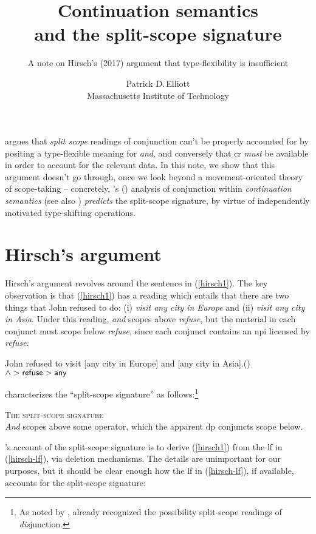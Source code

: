 \documentclass[cronos]{ling-paper}
\title{Continuation semantics\\
  and the split-scope signature}
\subtitle{A note on Hirsch's (2017) argument that type-flexibility is insufficient}
\author{Patrick D.\,Elliott\\Massachusetts Institute of Technology}
\begin{document}
\maketitle

\citet{hirschThesis} argues that \textit{split scope} readings of conjunction
can't be properly accounted for by positing a type-flexible meaning for
\textit{and}, and conversely that \ac{cr} \textit{must} be available in order to
account for the relevant data. In this note, we show that this argument doesn't
go through, once we look beyond a movement-oriented theory of scope-taking -- concretely, \citeauthor{barker2002}'s (\citeyear{barker2002}) analysis of conjunction
within \textit{continuation semantics} (see also \citealt[chapter
7]{barkerShan2015}) \textit{predicts} the split-scope signature, by virtue of
independently motivated type-shifting operations.

\section{Hirsch's argument}

Hirsch's argument revolves around the sentence in (\ref{hirsch1}). The key
observation is that (\ref{hirsch1}) has a reading which entails that there are
two things that John refused to do: (i) \textit{visit any city in Europe} and
(ii) \textit{visit any city in Asia}. Under this reading, \textit{and} scopes
above \textit{refuse}, but the material in each conjunct must scope below
\textit{refuse}, since each conjunct contains an \ac{npi} licensed by \textit{refuse}.

\ex
John refused to visit [any city in Europe] and [any city in
Asia].\label{hirsch1}\hfill(\citealt[p.\,90]{hirschThesis})\\
\phantom{,}\hfill $\wedge > \textsf{refuse} > \textsf{any}$
\xe

\citeauthor{hirschThesis} characterizes the \enquote{split-scope signature} as
follows:\footnote{As noted by \citeauthor{hirschThesis}, \citet{parteeRooth}
  already recognized the possibility split-scope readings of \textit{dis}junction.}

\ex \textsc{The split-scope signature}\\
\textit{And} scopes above some operator, which the apparent \ac{dp} conjuncts
scope below.\hfill\citep[90]{hirschThesis}
\xe

\citeauthor{hirschThesis}'s account of the split-scope signature is to derive
(\ref{hirsch1}) from the \ac{lf} in (\ref{hirsch-lf}), via deletion mechanisms.
The details are unimportant for our purposes, but it should be clear enough how
the \ac{lf} in (\ref{hirsch-lf}), if available, accounts for the split-scope signature:
\end{document}
